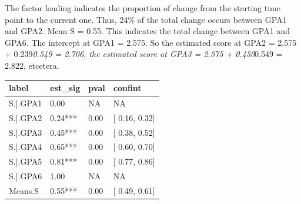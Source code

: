 \documentclass[
]{book}
\newenvironment{Shaded}{\begin{snugshade}}{\end{snugshade}}
\newcommand{\AttributeTok}[1]{\textcolor[rgb]{0.77,0.63,0.00}{#1}}
\newcommand{\CommentTok}[1]{\textcolor[rgb]{0.56,0.35,0.01}{\textit{#1}}}
\newcommand{\ConstantTok}[1]{\textcolor[rgb]{0.00,0.00,0.00}{#1}}
\newcommand{\FunctionTok}[1]{\textcolor[rgb]{0.00,0.00,0.00}{#1}}
\newcommand{\NormalTok}[1]{#1}
\newcommand{\OtherTok}[1]{\textcolor[rgb]{0.56,0.35,0.01}{#1}}
\newcommand{\SpecialCharTok}[1]{\textcolor[rgb]{0.00,0.00,0.00}{#1}}
\newcommand{\StringTok}[1]{\textcolor[rgb]{0.31,0.60,0.02}{#1}}
\begin{document}
\begin{Shaded}
\end{Shaded}

The factor loading indicates the proportion of change from the starting time point to the
current one. Thus, 24\% of the total change occurs between GPA1 and GPA2. Mean S = 0.55. This indicates the total change between GPA1 and GPA6. The intercept at GPA1 = 2.575. So the
estimated score at GPA2 = 2.575 + 0.239\emph{0.549 = 2.706, the estimated score at GPA3 =
2.575 + 0.450}0.549 = 2.822, etcetera.

\begin{tabular}[t]{l|l|l|l}
\hline
label & est\_sig & pval & confint\\
\hline
S.|.GPA1 & 0.00 & NA & NA\\
\hline
S.|.GPA2 & 0.24*** & 0.00 & [ 0.16,  0.32]\\
\hline
S.|.GPA3 & 0.45*** & 0.00 & [ 0.38,  0.52]\\
\hline
S.|.GPA4 & 0.65*** & 0.00 & [ 0.60,  0.70]\\
\hline
S.|.GPA5 & 0.81*** & 0.00 & [ 0.77,  0.86]\\
\hline
S.|.GPA6 & 1.00 & NA & NA\\
\hline
Means.S & 0.55*** & 0.00 & [ 0.49,  0.61]\\
\hline
\end{tabular}
\end{document}
